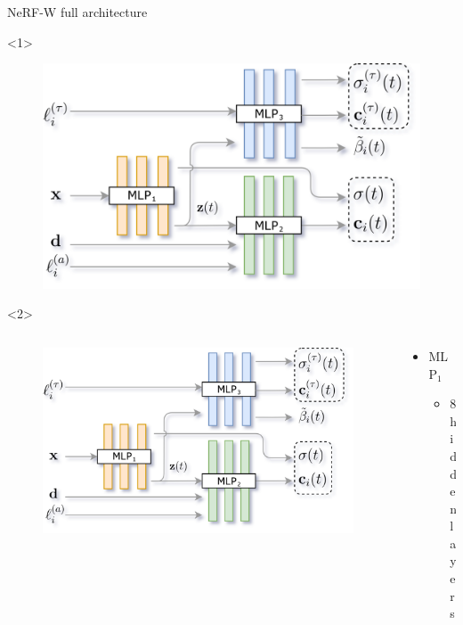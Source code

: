 \documentclass[aspectratio=1610]{beamer}
\begin{document}
\begin{frame}{NeRF-W full architecture}
    \begin{onlyenv}<1>
        \begin{figure}[H]
            \includegraphics[width=.8\textwidth,keepaspectratio]{nerfw-architecture.png}
        \end{figure}
    \end{onlyenv}
    \begin{onlyenv}<2>
        \begin{columns}
            \begin{column}{.7\textwidth}
                \begin{figure}[H]
                    \raggedleft
                    \includegraphics[width=.9\textwidth,keepaspectratio]{nerfw-architecture.png}
                \end{figure}
            \end{column}
            \begin{column}{.3\textwidth}
                \begin{itemize}
                    \item MLP\(_1\)
                    \begin{itemize}
                        \item 8 hidden layers

\end{itemize}
\end{itemize}
\end{column}
\end{columns}
\end{onlyenv}
\end{frame}
\end{document}
